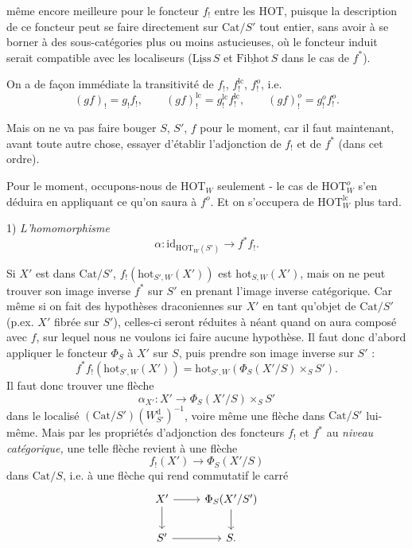 \documentclass[11pt]{article}
\newcommand{\printedpage}[1]{\marginpar{\footnotesize p.~#1}}
\newcommand{\msp}[1]{\marginpar{\footnotesize [#1]}}
\newcommand{\HOT}{\mathrm{HOT}}
\newcommand{\hot}{\mathrm{hot}}
\newcommand{\Cat}{\mathrm{Cat}}
\newcommand{\id}{\mathrm{id}}
\newcommand{\Wd}{W^{\mathrm{d}}}
\begin{document}
\printedpage{84}
même encore meilleure pour le foncteur $f_!$ entre les HOT, puisque la description de ce foncteur peut se faire directement sur $\Cat/S'$ tout entier, sans avoir à se borner à des sous-catégories plus ou moins \msp{page 138}astucieuses, où le foncteur induit serait compatible avec les localiseurs ($\underline{\mathrm{Liss}}\,S$ et $\underline{\mathrm{Fibhot}}\,S$ dans le cas de $f^*$).

On a de façon immédiate la transitivité de $f_!$, $f_!^{\mathrm{lc}}$, $f_!^{o}$, i.e.
\[
(gf)_! = g_!f_!, \qquad (gf)_!^{\mathrm{lc}} = g_!^{\mathrm{lc}}f_!^{\mathrm{lc}}, \qquad (gf)_!^{o} = g_!^{o}f_!^{o}.
\]

Mais on ne va pas faire bouger $S$, $S'$, $f$ pour le moment, car il faut maintenant, avant toute autre chose, essayer d'établir l'adjonction de $f_!$ et de $f^*$ (dans cet ordre).

Pour le moment, occupons-nous de $\HOT_W$ seulement - le cas de $\HOT_W^{o}$ s'en déduira en appliquant ce qu'on saura à $f^{o}$. Et on s'occupera de $\HOT_W^{\mathrm{lc}}$ plus tard.

1) \textit{L'homomorphisme}
\[
\alpha : \id_{\HOT_W(S')} \longrightarrow f^*f_!.
\]

Si $X'$ est dans $\Cat/S'$, $f_!(\hot_{S',W}(X'))$ est $\hot_{S,W}(X')$, mais on ne peut trouver son image inverse $f^*$ sur $S'$ en prenant l'image inverse catégorique. Car même si on fait des hypothèses draconiennes sur $X'$ en tant qu'objet de $\Cat/S'$ (p.ex. $X'$ fibrée sur $S'$), celles-ci seront réduites à néant quand on aura composé avec $f$, sur lequel nous ne voulons ici faire aucune hypothèse. Il \msp{page 139}faut donc d'abord appliquer le foncteur $\Phi_S$ à $X'$ sur $S$, puis prendre son image inverse sur $S'$ :
\[
f^*f_!(\hot_{S',W}(X')) = \hot_{S',W}(\Phi_S(X'/S)\times_S S').
\]
Il faut donc trouver une flèche
\[
\alpha_{X'} : X' \longrightarrow \Phi_S(X'/S)\times_S S'
\]
dans le localisé $(\Cat/S')(\Wd_{S'})^{-1}$, voire même une flèche dans $\Cat/S'$ lui-même. Mais par les propriétés d'adjonction des foncteurs $f_!$ et $f^*$ au \textit{niveau catégorique,} une telle flèche revient à une flèche
\[
f_!(X') \longrightarrow \Phi_S(X'/S)
\]
dans $\Cat/S$, i.e. à une flèche qui rend commutatif le carré
\[
\begin{tikzcd}
X' \arrow[r] \arrow[d] & \Phi_S(X'/S') \arrow[d] \\ %
S' \arrow[r] & S.
\end{tikzcd}
\]
\end{document}
